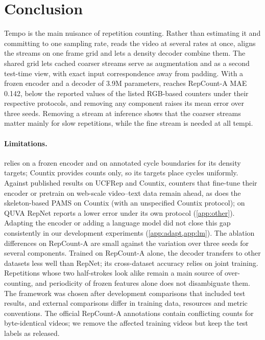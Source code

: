 \section{Conclusion}
\label{sec:conclusion}
Tempo is the main nuisance of repetition counting. Rather than estimating it and
committing to one sampling rate, \method reads the video at several rates at once,
aligns the streams on one frame grid and lets a density decoder combine them. The
shared grid lets cached coarser streams serve as augmentation and as a second
test-time view, with exact input correspondence away from padding. With a frozen
encoder and a decoder of 3.9M parameters, \method reaches RepCount-A MAE 0.142,
below the reported values of the listed RGB-based counters under their respective
protocols, and removing any component raises its mean error over three seeds.
Removing a stream at inference shows that the coarser streams matter mainly for
slow repetitions, while the fine stream is needed at all tempi.

\paragraph{Limitations.} \method relies on a frozen encoder and on annotated
cycle boundaries for its density targets; Countix provides counts only, so its
targets place cycles uniformly. Against published results on UCFRep and Countix,
counters that fine-tune their encoder or pretrain on web-scale video--text data
remain ahead, as does the skeleton-based PAMS on Countix (with an unspecified
Countix protocol); on QUVA RepNet reports a lower error under its own protocol
(\cref{app:other}). Adapting the encoder or adding a language
model did not close this gap consistently in our development experiments
(\cref{app:adapt,app:lm}). The ablation differences on RepCount-A are small
against the variation over three seeds for several components. Trained on RepCount-A alone, the decoder transfers to
other datasets less well than RepNet; its cross-dataset accuracy relies on joint
training. Repetitions whose two half-strokes look alike remain a main source of
over-counting, and periodicity of frozen features alone does not disambiguate
them. The framework was chosen after development comparisons that included test
results, and external comparisons differ in training data, resources and metric
conventions. The official RepCount-A annotations contain conflicting counts for
byte-identical videos; we remove the affected training videos but keep the test
labels as released.
